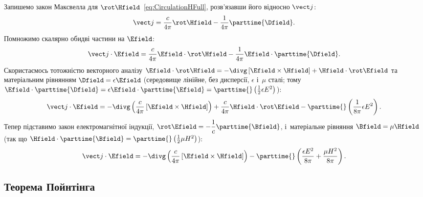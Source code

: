 Запишемо закон Максвелла для $\rot\Hfield$~\eqref{eq:CirculationHFull}, розв'язавши його
відносно $\vect j$:
\begin{equation*}
	\vect j = \frac{c}{4\pi}\rot\Hfield - \frac1{4\pi}\parttime{\Dfield}.
\end{equation*}
Помножимо скалярно обидві частини на $\Efield$:
\begin{equation*}
	\vect j\cdot\Efield = \frac{c}{4\pi}\Efield\cdot\rot\Hfield - \frac1{4\pi}\Efield\cdot\parttime{\Dfield}.
\end{equation*}
Скористаємось тотожністю векторного аналізу $\Efield\cdot\rot\Hfield =
-\divg\left[\Efield\times\Hfield\right] + \Hfield\cdot\rot\Efield$ та матеріальним
рівнянням $\Dfield=\epsilon\Efield$ (середовище лінійне, без дисперсії, $\epsilon$ і~$\mu$
сталі; тому $\Efield\cdot\parttime{\Dfield} = \epsilon\Efield\cdot\parttime{\Efield} =
\parttime{}\left(\tfrac12\epsilon E^2\right)$):
\begin{equation*}
	\vect j\cdot\Efield = -\divg\left(\frac{c}{4\pi}\left[\Efield\times\Hfield\right]\right) + \frac{c}{4\pi}\Hfield\cdot\rot\Efield -
	\parttime{}\left(\frac1{8\pi}\epsilon E^2\right).
\end{equation*}
Тепер підставимо закон електромагнітної індукції, $\rot\Efield =
-\dfrac1c\parttime{\Bfield}$, і~матеріальне рівняння $\Bfield=\mu\Hfield$ (так що
$\Hfield\cdot\parttime{\Bfield} = \parttime{}\left(\tfrac12\mu H^2\right)$):
\begin{equation*}
	\vect j\cdot\Efield = -\divg\left(\frac{c}{4\pi}\left[\Efield\times\Hfield\right]\right) - \parttime{}\left(\frac{\epsilon E^2}{8\pi} +
	\frac{\mu H^2}{8\pi}\right).
\end{equation*}


\subsection*{Теорема Пойнтінга}


